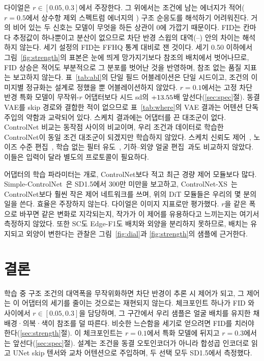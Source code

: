\documentclass[10pt,twocolumn,a4paper]{article}
\begin{document}
다이얼은 $r \in [0.05, 0.3]$에서 주장한다. 그 위에서는 조건에 남는 에너지가 적어($r{=}0.5$에서
상수항 제외 스펙트럼 에너지의 \acRetainedFiveZero{}) 구조 순응도를 해석하기 어려워진다. 거의
비어 있는 두 신호는 모델이 무엇을 하든 상관이 0에 가깝기 때문이다. FID는 칸마다 추정값이
하나뿐이고 분산이 없으므로 차단 반경 스윕의 대역(\fidMainZero{}--\fidMainOneHundred{}) 안의
차이는 해석하지 않는다. 세기 설정의 FID는 FFHQ 통계 대비로 잰 것이다. 세기 0.50 이하에서
그림~\ref{fig:strength}의 표본은 눈에 띄게 망가지기보다 참조의 배치에서 벗어나므로, FID 상승은
적어도 부분적으로 그 분포를 벗어난 것을 반영하며, 참조 없는 품질 지표는 보고하지 않는다.
표~\ref{tab:abl}의 단일 필드 어블레이션은 단일 시드이고, 조건의 이미지별 정규화는 설계로
정했을 뿐 어블레이션하지 않았다. $r{=}0.1$에서는 고정 차단 반경 특화 모델이 무작위-$r$ 어댑터보다
시드 sd의 $+13.55{}$배 앞선다(\ref{sec:spec}절). 동결 VAE를 skip 경로와 결합한 적이
없으므로 표~\ref{tab:where}의 VAE 결과는 어텐션 단독 주입의 약함과 교락되어 있다. 스케치
결과에는 어댑터를 끈 대조군이 없다. ControlNet 비교는 동작점 사이의 비교이며, 우리 조건과
데이터로 학습한 ControlNet이 동일 조건 대조군이 되겠지만 학습하지 않았다. 스케치 신뢰도
제어~\cite{yang2020deep}, 노이즈 수준 편집~\cite{meng2022sdedit}, 학습 없는 필터
유도~\cite{gu2024filter}, 기하--외양 얼굴 편집~\cite{chen2021deepfaceediting}과도 비교하지
않았다. 이들은 입력이 달라 별도의 프로토콜이 필요하다.

어댑터의 학습 파라미터는 \ourParams{}개로, ControlNet보다 적고 최근 경량 제어 모듈보다
많다. Simple-ControlNet~\cite{feng2025simplifying}은 SD1.5에서 300만 미만을 보고하고,
ControlNet-XS~\cite{zavadski2023controlnet}는 ControlNet보다 훨씬 작은 제어 네트워크를 쓰며,
위의 DiT 모듈들은 우리의 몇 분의 일을 쓴다. 효율은 주장하지 않는다. 다이얼은 이미지 지표로만
평가했다. $r$을 같은 폭으로 바꾸면 같은 변화로 지각되는지, 작가가 이 제어를 유용하다고
느끼는지는 여기서 측정하지 않았다. 또한 SC도 Edge-F1도 배치와 외양을 분리하지 못하므로,
배치는 유지되고 외양이 변한다는 관찰은 그림~\ref{fig:dial}과 \ref{fig:strength}의 샘플에
근거한다.

\section{결론}

학습 중 구조 조건의 대역폭을 무작위화하면 차단 반경이 추론 시 제어가 되고, 그 제어는 이
어댑터의 세기를 줄이는 것으로는 재현되지 않는다. 체크포인트 하나가 FID
\fidMainZeroFive{}와 \fidMainOneZero{} 사이에서 $r \in [0.05, 0.3]$을 담당하며, 그 구간에서
우리 샘플은 얼굴 배치를 유지한 채 배경·의복·색이 참조를 덜 따른다. 비슷한 느슨함을 세기로
얻으려면 FID를 치러야 한다(\ref{sec:strength}절). 이 체크포인트는 $r{=}0.1$에서 특화 모델에
뒤지고 $r{=}0.3$에서는 앞선다(\ref{sec:spec}절). 설계는 조건을 동결 오토인코더가 아니라
합성곱 인코더로 읽고 UNet skip 텐서와 교차 어텐션으로 주입하며, 두 선택 모두 SD1.5에서
측정했다.
\end{document}
